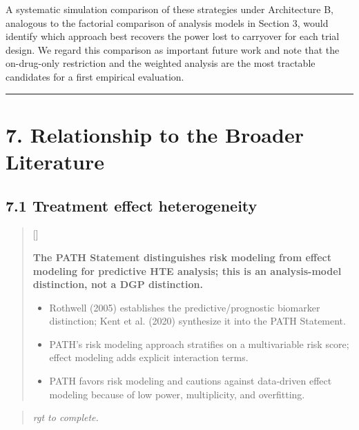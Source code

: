 \documentclass[
  11pt,
]{article}
\newcounter{pgraph}
\newenvironment{bullets}{%
  \stepcounter{pgraph}%
  \begin{quote}\small\sffamily\color[gray]{0.30}%
  {\normalfont\scriptsize\color[gray]{0.58}[\thepgraph]\enspace}}{%
  \end{quote}}
\newenvironment{rgt}{%
  \begin{quote}\small\itshape\color[RGB]{20,60,160}}{%
  \end{quote}}
\begin{document}
A systematic simulation comparison of these strategies under
Architecture B, analogous to the factorial comparison of analysis models
in Section 3, would identify which approach best recovers the power lost
to carryover for each trial design. We regard this comparison as
important future work and note that the on-drug-only restriction and the
weighted analysis are the most tractable candidates for a first
empirical evaluation.

\bigskip\noindent

\rule{\textwidth}{0.4pt}\bigskip

\section{7. Relationship to the Broader Literature}

\subsection{7.1 Treatment effect heterogeneity}

\begin{bullets}

\textbf{The PATH Statement distinguishes risk modeling from effect
modeling for predictive HTE analysis; this is an analysis-model
distinction, not a DGP distinction.}

\begin{itemize}\setlength{\itemsep}{2pt}\setlength{\parskip}{0pt}
\item Rothwell (2005) establishes the predictive/prognostic
  biomarker distinction; Kent et al. (2020) synthesize it into
  the PATH Statement.
\item PATH's risk modeling approach stratifies on a multivariable
  risk score; effect modeling adds explicit interaction terms.
\item PATH favors risk modeling and cautions against data-driven
  effect modeling because of low power, multiplicity, and
  overfitting.
\end{itemize}

\end{bullets}

\begin{rgt}
rgt to complete.

\end{rgt}
\end{document}
